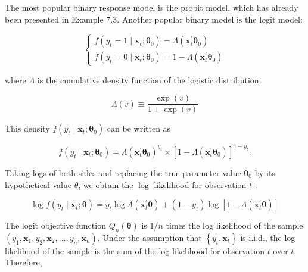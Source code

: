 \documentclass[10pt]{article}
\begin{document}
The most popular binary response model is the probit model, which has already been presented in Example 7.3. Another popular binary model is the logit model:

\[
\left\{\begin{array}{l}
f\left(y_{t}=1 \mid \mathbf{x}_{t} ; \boldsymbol{\theta}_{0}\right)=\Lambda\left(\mathbf{x}_{t}^{\prime} \boldsymbol{\theta}_{0}\right)  \tag{8.1.1}\\
f\left(y_{t}=0 \mid \mathbf{x}_{t} ; \boldsymbol{\theta}_{0}\right)=1-\Lambda\left(\mathbf{x}_{t}^{\prime} \boldsymbol{\theta}_{0}\right)
\end{array}\right.
\]

where $\Lambda$ is the cumulative density function of the logistic distribution:


\begin{equation*}
\Lambda(v) \equiv \frac{\exp (v)}{1+\exp (v)} \tag{8.1.2}
\end{equation*}


This density $f\left(y_{t} \mid \mathbf{x}_{t} ; \boldsymbol{\theta}_{0}\right)$ can be written as


\begin{equation*}
f\left(y_{t} \mid \mathbf{x}_{t} ; \boldsymbol{\theta}_{0}\right)=\Lambda\left(\mathbf{x}_{t}^{\prime} \boldsymbol{\theta}_{0}\right)^{y_{t}} \times\left[1-\Lambda\left(\mathbf{x}_{t}^{\prime} \boldsymbol{\theta}_{0}\right)\right]^{1-y_{t}} . \tag{8.1.3}
\end{equation*}


Taking logs of both sides and replacing the true parameter value $\boldsymbol{\theta}_{0}$ by its hypothetical value $\theta$, we obtain the $\log$ likelihood for observation $t$ :


\begin{equation*}
\log f\left(y_{t} \mid \mathbf{x}_{t} ; \boldsymbol{\theta}\right)=y_{t} \log \Lambda\left(\mathbf{x}_{t}^{\prime} \boldsymbol{\theta}\right)+\left(1-y_{t}\right) \log \left[1-\Lambda\left(\mathbf{x}_{t}^{\prime} \boldsymbol{\theta}\right)\right] \tag{8.1.4}
\end{equation*}


The logit objective function $Q_{n}(\boldsymbol{\theta})$ is $1 / n$ times the log likelihood of the sample $\left(y_{1}, \mathbf{x}_{1}, y_{2}, \mathbf{x}_{2}, \ldots, y_{n}, \mathbf{x}_{n}\right)$. Under the assumption that $\left\{y_{t}, \mathbf{x}_{t}\right\}$ is i.i.d., the log likelihood of the sample is the sum of the log likelihood for observation $t$ over $t$. Therefore,
\end{document}
